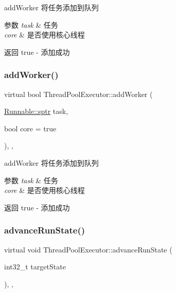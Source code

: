 add\+Worker 将任务添加到队列 


\begin{DoxyParams}{参数}
{\em task} & 任务 \\
\hline
{\em core} & 是否使用核心线程\\
\hline
\end{DoxyParams}
\begin{DoxyReturn}{返回}
true -\/ 添加成功 
\end{DoxyReturn}
\mbox{\label{classThreadPoolExecutor_ac2615dd9c245049110104603289beb54}} 
\subsubsection{\texorpdfstring{add\+Worker()}{addWorker()}\hspace{0.1cm}{\footnotesize\ttfamily [2/2]}}
{\footnotesize\ttfamily virtual bool Thread\+Pool\+Executor\+::add\+Worker (\begin{DoxyParamCaption}\item[{\hyperlink{classRunnable_abe8d3066c7305401d6f0aad8e70780f2}{Runnable\+::sptr}}]{task,  }\item[{bool}]{core = {\ttfamily true} }\end{DoxyParamCaption})\hspace{0.3cm}{\ttfamily [final]}, {\ttfamily [protected]}, {\ttfamily [virtual]}}



add\+Worker 将任务添加到队列 


\begin{DoxyParams}{参数}
{\em task} & 任务 \\
\hline
{\em core} & 是否使用核心线程\\
\hline
\end{DoxyParams}
\begin{DoxyReturn}{返回}
true -\/ 添加成功 
\end{DoxyReturn}
\mbox{\label{classThreadPoolExecutor_abaa3926310766a93b7fe1d83b77efdae}} 
\subsubsection{\texorpdfstring{advance\+Run\+State()}{advanceRunState()}}
{\footnotesize\ttfamily virtual void Thread\+Pool\+Executor\+::advance\+Run\+State (\begin{DoxyParamCaption}\item[{int32\+\_\+t}]{target\+State }\end{DoxyParamCaption})\hspace{0.3cm}{\ttfamily [final]}, {\ttfamily [protected]}, {\ttfamily [virtual]}}



